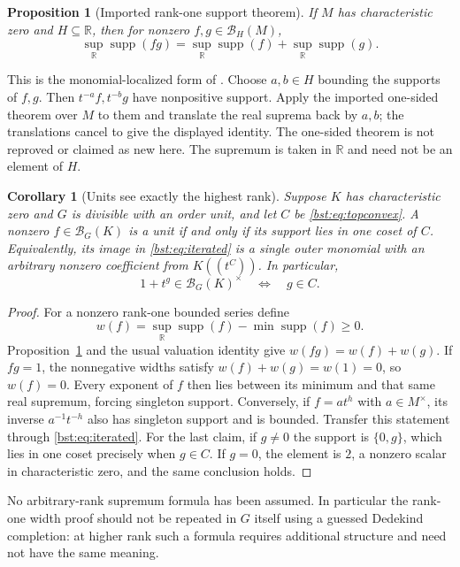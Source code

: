 \documentclass[11pt,letterpaper]{article}
\newtheorem{proposition}[theorem]{Proposition}
\newtheorem{corollary}[theorem]{Corollary}
\theoremstyle{definition}
\theoremstyle{remark}
\newcommand{\R}{\mathbb R}
\newcommand{\supp}{\operatorname{supp}}
\newcommand{\HH}[2]{#1((t^{#2}))}
\newcommand{\BB}[2]{\mathcal B_{#2}(#1)}
\begin{document}
\begin{proposition}[Imported rank-one support theorem]\label{bst:prop:supimport}
If $M$ has characteristic zero and $H\subseteq\R$, then for nonzero
$f,g\in\BB MH$,
\[
 \sup_{\R}\supp(fg)=\sup_{\R}\supp(f)+\sup_{\R}\supp(g).
\]
\end{proposition}
This is the monomial-localized form of
\cite[Proposition~3.5.1]{LM24}. Choose $a,b\in H$ bounding the supports
of $f,g$. Then $t^{-a}f,t^{-b}g$ have nonpositive support. Apply the
imported one-sided theorem over $M$ to them and translate the real
suprema back by $a,b$; the translations cancel to give the displayed
identity. The one-sided theorem is not reproved or claimed as new here.
The supremum is taken in $\R$ and need not be an element of $H$.

\begin{corollary}[Units see exactly the highest rank]\label{bst:cor:units}
Suppose $K$ has characteristic zero and $G$ is divisible with an order
unit, and let $C$ be \eqref{bst:eq:topconvex}. A nonzero $f\in\BB KG$ is a
unit if and only if its support lies in one coset of $C$. Equivalently,
its image in \eqref{bst:eq:iterated} is a single outer monomial with an arbitrary
nonzero coefficient from $\HH KC$. In particular,
\[
 1+t^g\in\BB KG^\times\quad\Longleftrightarrow\quad g\in C.
\]
\end{corollary}
\begin{proof}
For a nonzero rank-one bounded series define
\[
 w(f)=\sup_{\R}\supp(f)-\min\supp(f)\ge0.
\]
Proposition~\ref{bst:prop:supimport} and the usual valuation identity give
$w(fg)=w(f)+w(g)$. If $fg=1$, the nonnegative widths satisfy $w(f)+w(g)=w(1)=0$,
so $w(f)=0$. Every exponent of $f$ then lies between its minimum and
that same real supremum, forcing singleton support.
Conversely, if $f=a t^h$ with $a\in M^\times$, its inverse
$a^{-1}t^{-h}$ also has singleton support and is bounded.
Transfer this statement through \eqref{bst:eq:iterated}. For the last claim,
if $g\ne0$ the support is $\{0,g\}$, which lies in one coset precisely
when $g\in C$. If $g=0$, the element is $2$, a nonzero scalar in
characteristic zero, and the same conclusion holds.
\end{proof}

No arbitrary-rank supremum formula has been assumed. In particular the
rank-one width proof should not be repeated in $G$ itself using a guessed
Dedekind completion: at higher rank such a formula requires additional
structure and need not have the same meaning.
\end{document}
